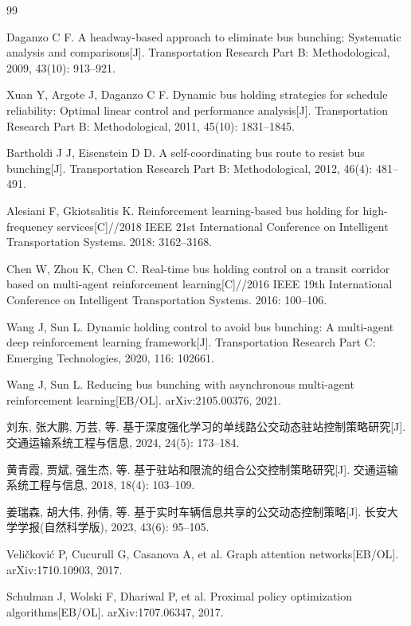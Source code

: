 \documentclass[UTF8,zihao=-4,fontset=none]{ctexart}
\begin{document}
\begin{thebibliography}{99}

Daganzo C F. A headway-based approach to eliminate bus bunching: Systematic analysis and comparisons[J]. Transportation Research Part B: Methodological, 2009, 43(10): 913--921.

Xuan Y, Argote J, Daganzo C F. Dynamic bus holding strategies for schedule reliability: Optimal linear control and performance analysis[J]. Transportation Research Part B: Methodological, 2011, 45(10): 1831--1845.

Bartholdi J J, Eisenstein D D. A self-coordinating bus route to resist bus bunching[J]. Transportation Research Part B: Methodological, 2012, 46(4): 481--491.

Alesiani F, Gkiotsalitis K. Reinforcement learning-based bus holding for high-frequency services[C]//2018 IEEE 21st International Conference on Intelligent Transportation Systems. 2018: 3162--3168.

Chen W, Zhou K, Chen C. Real-time bus holding control on a transit corridor based on multi-agent reinforcement learning[C]//2016 IEEE 19th International Conference on Intelligent Transportation Systems. 2016: 100--106.

Wang J, Sun L. Dynamic holding control to avoid bus bunching: A multi-agent deep reinforcement learning framework[J]. Transportation Research Part C: Emerging Technologies, 2020, 116: 102661.

Wang J, Sun L. Reducing bus bunching with asynchronous multi-agent reinforcement learning[EB/OL]. arXiv:2105.00376, 2021.

刘东, 张大鹏, 万芸, 等. 基于深度强化学习的单线路公交动态驻站控制策略研究[J]. 交通运输系统工程与信息, 2024, 24(5): 173--184.

黄青霞, 贾斌, 强生杰, 等. 基于驻站和限流的组合公交控制策略研究[J]. 交通运输系统工程与信息, 2018, 18(4): 103--109.

姜瑞森, 胡大伟, 孙倩, 等. 基于实时车辆信息共享的公交动态控制策略[J]. 长安大学学报(自然科学版), 2023, 43(6): 95--105.

Veli{\v{c}}kovi{\'c} P, Cucurull G, Casanova A, et al. Graph attention networks[EB/OL]. arXiv:1710.10903, 2017.

Schulman J, Wolski F, Dhariwal P, et al. Proximal policy optimization algorithms[EB/OL]. arXiv:1707.06347, 2017.

\end{thebibliography}
\end{document}
